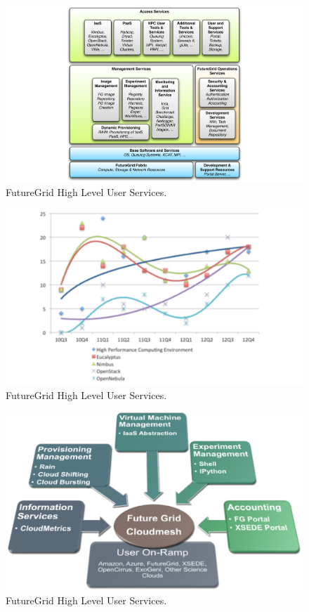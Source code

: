 \documentclass{article}
\begin{document}
\begin{figure}[h!]
  \caption{FutureGrid High Level User Services.}
  \centering
    \includegraphics[width=1.0\textwidth]{images/architecture.pdf}
\end{figure}

\begin{figure}[h!]
  \caption{FutureGrid High Level User Services.}
  \centering
    \includegraphics[width=1.0\textwidth]{images/trend.pdf}
\end{figure}

\begin{figure}[h!]
  \caption{FutureGrid High Level User Services.}
  \centering
    \includegraphics[width=1.0\textwidth]{images/cm-functionality.pdf}
\end{figure}
\end{document}
